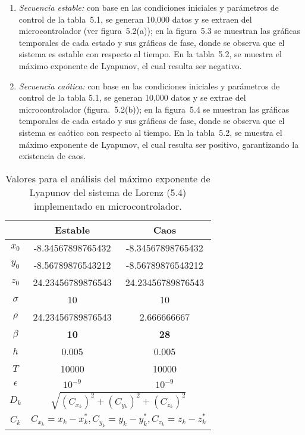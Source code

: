 \begin{enumerate}
\item \textit{Secuencia estable:} con base en las condiciones iniciales y parámetros de control de la tabla~5.1, se generan 10,000 datos y se extraen del microcontrolador (ver figura~5.2(a)); en la figura~5.3 se muestran las gráficas temporales de cada estado y sus gráficas de fase, donde se observa que el sistema es estable con respecto al tiempo. En la tabla~5.2, se muestra el máximo exponente de Lyapunov, el cual resulta ser negativo.    

\item \textit{Secuencia caótica:} con base en las condiciones iniciales y parámetros de control de la tabla 5.1, se generan 10,000 datos y se extrae del microcontrolador (figura.~5.2(b)); en la figura~5.4 se muestran las gráficas temporales de cada estado y sus gráficas de fase, donde se observa que el sistema es caótico con respecto al tiempo. En la tabla~5.2, se muestra el máximo exponente de Lyapunov, el cual resulta ser positivo, garantizando la existencia de caos. 
\end{enumerate}

\begin{table}[!htbp] %
	\center
	\begin{tabular}{c c c} 
	\hline
				&	Estable			&	Caos	\\
	\hline	
	$x_{0}$		&	-8.34567898765432	&	-8.34567898765432	\\
	$y_{0}$		&	-8.56789876543212		&	-8.56789876543212	\\
	$z_{0}$		&	24.23456789876543		&	24.23456789876543	\\
	$\sigma$			&	10						&	10	\\
	$\rho$			&	24.23456789876543		&	2.666666667	\\
	\textbf{$\beta$} &	\textbf{10}				&	\textbf{28}	\\
	$h$			&	0.005					&	0.005	\\
	$T$			&	10000					&	10000	\\
	$\epsilon$	& 	$10^{-9}$				&	$10^{-9}$	\\
	$D_{k}$		&	\multicolumn{2}{c}{$\sqrt{ (C_{x_{k}})^{2} + (C_{y{_k}})^{2} + (C_{z_{k}})^{2}}$}	\\   
	$C_{k}$		&	\multicolumn{2}{c}{$C_{x_{k}}=x_{k} -x^{*}_{k}, C_{y_{k}}=y_{k}-y^{*}_{k}, C_{z_{k}}=z_{k}-z^{*}_{k}$}	\\ 
	\hline
\end{tabular}
	\caption{Valores para el análisis del máximo exponente de Lyapunov del sistema de Lorenz (5.4) implementado en microcontrolador.}
\end{table}

